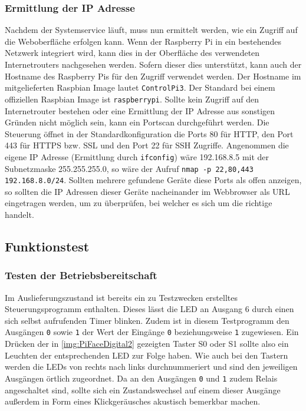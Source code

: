  \subsubsection{Ermittlung der IP Adresse}\label{chp:ausw:ip}
 Nachdem der Systemservice läuft, muss nun ermittelt werden, wie ein Zugriff auf die Weboberfläche erfolgen kann. Wenn der Raspberry Pi in ein bestehendes Netzwerk integriert wird, kann dies in der Oberfläche des verwendeten Internetrouters nachgesehen werden. Sofern dieser dies unterstützt, kann auch der Hostname des Raspberry Pis für den Zugriff verwendet werden. Der Hostname im mitgelieferten Raspbian Image lautet \texttt{ControlPi3}. Der Standard bei einem offiziellen Raspbian Image ist \texttt{raspberrypi}. Sollte kein Zugriff auf den Internetrouter bestehen oder eine Ermittlung der IP Adresse aus sonstigen Gründen nicht möglich sein, kann ein Portscan durchgeführt werden. Die Steuerung öffnet in der Standardkonfiguration die Ports 80 für HTTP, den Port 443 für HTTPS bzw. SSL und den Port 22 für SSH Zugriffe. Angenommen die eigene IP Adresse (Ermittlung durch \texttt{ifconfig}) wäre 192.168.8.5 mit der Subnetzmaske 255.255.255.0, so wäre der Aufruf \texttt{nmap -p 22,80,443 192.168.8.0/24}. Sollten mehrere gefundene Geräte diese Ports als offen anzeigen, so sollten die IP Adressen dieser Geräte nacheinander im Webbrowser als URL eingetragen werden, um zu überprüfen, bei welcher es sich um die richtige handelt.   
 
 \subsection{Funktionstest}
 \subsubsection{Testen der Betriebsbereitschaft}
 Im Auslieferungszustand ist bereits ein zu Testzwecken erstelltes Steuerungsprogramm enthalten. Dieses lässt die LED an Ausgang 6 durch einen sich selbst aufrufenden Timer blinken. Zudem ist in diesem Testprogramm den Ausgängen \texttt{0} sowie \texttt{1} der Wert der Eingänge \texttt{0} beziehungsweise \texttt{1} zugewiesen. Ein Drücken der in \autoref{img:PiFaceDigital2} gezeigten Taster S0 oder S1 sollte also ein Leuchten der entsprechenden LED zur Folge haben. Wie auch bei den Tastern werden die LEDs von rechts nach links durchnummeriert und sind den jeweiligen Ausgängen örtlich zugeordnet. Da an den Ausgängen \texttt{0} und \texttt{1} zudem Relais angeschaltet sind, sollte sich ein Zustandswechsel auf einem dieser Ausgänge außerdem in Form eines Klickgeräusches akustisch bemerkbar machen. 

